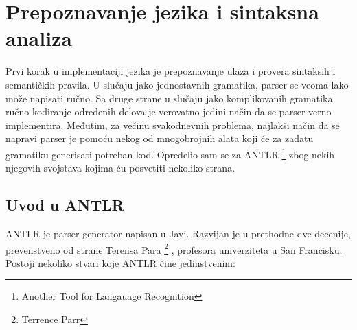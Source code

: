 \chapter{Prepoznavanje jezika i sintaksna analiza}

Prvi korak u implementaciji jezika je prepoznavanje ulaza i provera sintaksih i semantičkih pravila. 
U slučaju jako jednostavnih gramatika, parser se veoma lako može napisati ručno. 
Sa druge strane u slučaju jako komplikovanih gramatika ručno kodiranje određenih delova je verovatno jedini način da se parser verno implementira. 
Međutim, za većinu svakodnevnih problema, najlakši način da se napravi parser je pomoću nekog od mnogobrojnih alata koji će za zadatu gramatiku generisati potreban kod. 
Opredelio sam se za ANTLR
\footnote{\skr \eng Another Tool for Langauage Recognition} 
zbog nekih njegovih svojstava kojima ću posvetiti nekoliko strana.

\section{Uvod u ANTLR}

ANTLR je parser generator napisan u Javi. 
Razvijan je u prethodne dve decenije, prevenstveno od strane Terensa Para
\footnote{Terrence Parr}
, profesora univerziteta u San Francisku. Postoji nekoliko stvari koje ANTLR čine jedinstvenim\cite{antlr-contrib}:

